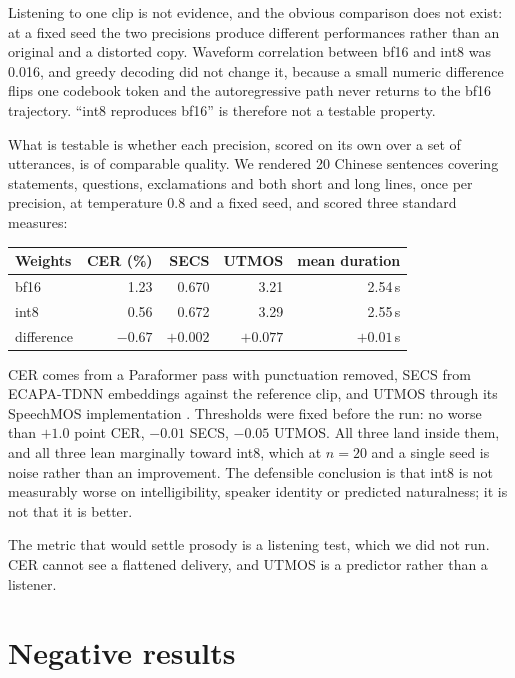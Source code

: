\documentclass[11pt]{article}
\begin{document}
Listening to one clip is not evidence, and the obvious comparison does not exist: at a fixed seed the two
precisions produce different performances rather than an original and a distorted copy. Waveform correlation
between bf16 and int8 was 0.016, and greedy decoding did not change it, because a small numeric difference flips
one codebook token and the autoregressive path never returns to the bf16 trajectory. ``int8 reproduces bf16'' is
therefore not a testable property.

What is testable is whether each precision, scored on its own over a set of utterances, is of comparable quality.
We rendered 20 Chinese sentences covering statements, questions, exclamations and both short and long lines, once
per precision, at temperature 0.8 and a fixed seed, and scored three standard measures:

\begin{center}
\begin{tabular}{lrrrr}
\toprule
Weights & CER (\%) & SECS & UTMOS & mean duration \\
\midrule
bf16 & 1.23 & 0.670 & 3.21 & 2.54\,s \\
int8 & 0.56 & 0.672 & 3.29 & 2.55\,s \\
\midrule
difference & $-0.67$ & $+0.002$ & $+0.077$ & $+0.01$\,s \\
\bottomrule
\end{tabular}
\end{center}

CER comes from a Paraformer pass with punctuation removed, SECS from ECAPA-TDNN embeddings against the reference
clip, and UTMOS \cite{utmos} through its SpeechMOS implementation \cite{speechmos}. Thresholds were fixed before the run: no worse than $+1.0$ point CER, $-0.01$ SECS,
$-0.05$ UTMOS. All three land inside them, and all three lean marginally toward int8, which at $n=20$ and a single
seed is noise rather than an improvement. The defensible conclusion is that int8 is not measurably worse on
intelligibility, speaker identity or predicted naturalness; it is not that it is better.

The metric that would settle prosody is a listening test, which we did not run. CER cannot see a flattened
delivery, and UTMOS is a predictor rather than a listener.

\section{Negative results}
\end{document}
